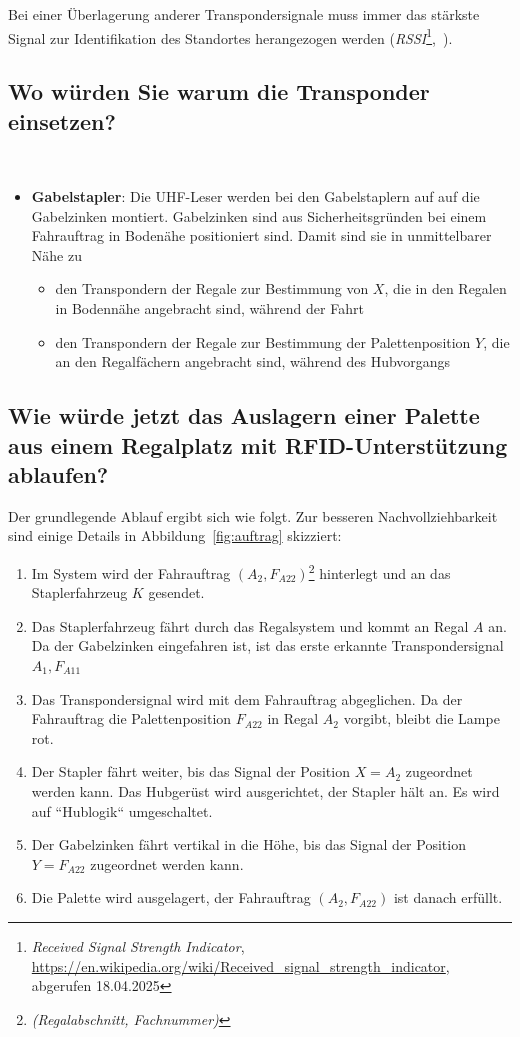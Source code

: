 \noindent
Bei einer Überlagerung anderer Transpondersignale muss immer das stärkste Signal zur Identifikation des Standortes herangezogen werden (\textit{RSSI}\footnote{\textit{Received Signal Strength Indicator}, \url{https://en.wikipedia.org/wiki/Received_signal_strength_indicator}, abgerufen 18.04.2025},~\cite[136]{ES5}).


\subsection*{Wo würden Sie warum die Transponder einsetzen?}\\
\begin{itemize}
    \itemsep0.5em
    \item \textbf{Gabelstapler}: Die UHF-Leser werden bei den Gabelstaplern auf auf die Gabelzinken montiert. Gabelzinken sind aus Sicherheitsgründen bei einem Fahrauftrag in Bodenähe positioniert sind. Damit sind sie in unmittelbarer Nähe zu
    \begin{itemize}
        \item den Transpondern der Regale zur Bestimmung von $X$, die in den Regalen in Bodennähe angebracht sind, während der Fahrt
        \item den Transpondern der Regale zur Bestimmung der Palettenposition $Y$, die an den Regalfächern angebracht sind, während des Hubvorgangs
    \end{itemize}
\end{itemize}

\subsection*{Wie würde jetzt das Auslagern einer Palette aus einem Regalplatz mit RFID-Unterstützung ablaufen?}
Der grundlegende Ablauf ergibt sich wie folgt.
Zur besseren Nachvollziehbarkeit sind einige Details in Abbildung~\ref{fig:auftrag} skizziert:

\begin{enumerate}
    \itemsep0.5em
    \item Im System wird der Fahrauftrag $(A_2, F_{A22})$\footnote{\textit{(Regalabschnitt, Fachnummer)}} hinterlegt und an das Staplerfahrzeug $K$ gesendet.
    \item Das Staplerfahrzeug fährt durch das Regalsystem und kommt an Regal $A$ an.
    Da der Gabelzinken eingefahren ist, ist das erste erkannte Transpondersignal $A_1, F_{A11}$
    \item Das Transpondersignal wird mit dem Fahrauftrag abgeglichen.
    Da der Fahrauftrag die Palettenposition $F_{A22}$ in Regal $A_2$ vorgibt, bleibt die Lampe rot.
    \item Der Stapler fährt weiter, bis das Signal der Position $X=A_{2}$ zugeordnet werden kann. Das Hubgerüst wird ausgerichtet,
    der Stapler hält an. Es wird auf ``Hublogik`` umgeschaltet.
    \item Der Gabelzinken fährt vertikal in die Höhe, bis das Signal der Position $Y=F_{A22}$ zugeordnet werden kann.
    \item Die Palette wird ausgelagert, der Fahrauftrag $(A_2, F_{A22})$ ist danach erfüllt.
\end{enumerate}




